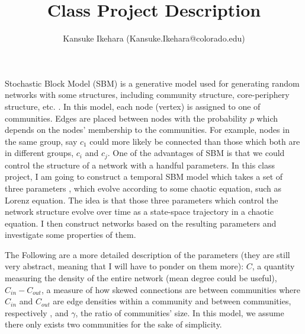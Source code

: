 \documentclass{article}
\title{Class Project Description}
\author{Kansuke Ikehara (Kansuke.Ikehara@colorado.edu)}
\begin{document}
\maketitle
Stochastic Block Model (SBM) is a generative model used for generating random networks with some structures, including community structure, core-periphery structure, etc. \cite{SBM}. In this model, each node (vertex) is assigned to one of communities. Edges are placed between nodes with the probability $p$ which depends on the nodes' membership to the communities. For example, nodes in the same group, say $c_{1}$ could more likely be connected than those which both are in different groups, $c_{i}$ and $c_{j}$. One of the advantages of SBM is that we could control the structure of a network with a handful parameters. In this class project, I am going to construct a temporal SBM model which takes a set of three parameters , which evolve according to some chaotic equation, such as Lorenz equation. The idea is that those three parameters which control the network structure evolve over time as a state-space trajectory in a chaotic equation. I then construct networks based on the resulting parameters and investigate some properties of them.

The Following are a more detailed description of the parameters (they are still very abstract, meaning that I will have to ponder on them more): $C$, a quantity measuring the density of the entire network (mean degree could be useful),  $C_{in} - C_{out}$, a measure of how skewed connections are between communities where $C_{in}$ and $C_{out}$  are edge densities within a community and between communities, respectively , and $\gamma$, the ratio of communities' size. In this model, we assume there only exists two communities for the sake of simplicity.

 
\end{document}
